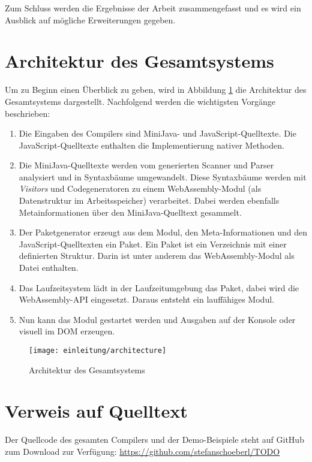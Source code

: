 Zum Schluss werden die Ergebnisse der Arbeit zusammengefasst und es wird ein Ausblick auf mögliche Erweiterungen gegeben.

\pagebreak
\section{Architektur des Gesamtsystems}

Um zu Beginn einen Überblick zu geben, wird in Abbildung \ref{fig:architecture} die Architektur des Gesamtsystems dargestellt. Nachfolgend werden die wichtigsten Vorgänge beschrieben:

\begin{enumerate}
    \item Die Eingaben des Compilers sind MiniJava- und Ja\-va\-Script-Quelltexte. Die Ja\-va\-Script-Quelltexte enthalten die Implementierung nativer Methoden.
    \item Die MiniJava-Quelltexte werden vom generierten Scanner und Parser analysiert und in Syntaxbäume umgewandelt. Diese Syntaxbäume werden mit \emph{Visitors} und Codegeneratoren zu einem WebAssembly-Modul (als Datenstruktur im Arbeitsspeicher) verarbeitet. Dabei werden ebenfalls Metainformationen über den Mi\-ni\-Ja\-va-Quelltext gesammelt.
    \item Der Paketgenerator erzeugt aus dem Modul, den Meta-Informationen und den JavaScript-Quelltexten ein Paket. Ein Paket ist ein Verzeichnis mit einer definierten Struktur. Darin ist unter anderem das WebAssembly-Modul als Datei enthalten.
    \item Das Laufzeitsystem lädt in der Laufzeitumgebung das Paket, dabei wird die Web\-As\-sem\-bly-API eingesetzt. Daraus entsteht ein lauffähiges Modul.
    \item Nun kann das Modul gestartet werden und Ausgaben auf der Konsole oder visuell im DOM erzeugen.
\end{enumerate}


\begin{figure}[]
    \centering
    \texttt{[image: einleitung/architecture]}
    \caption{Architektur des Gesamtsystems}
    \label{fig:architecture}
\end{figure}

\section{Verweis auf Quelltext}
Der Quellcode des gesamten Compilers und der Demo-Beispiele steht auf GitHub zum Download zur Verfügung: \url{https://github.com/stefanschoeberl/TODO}
